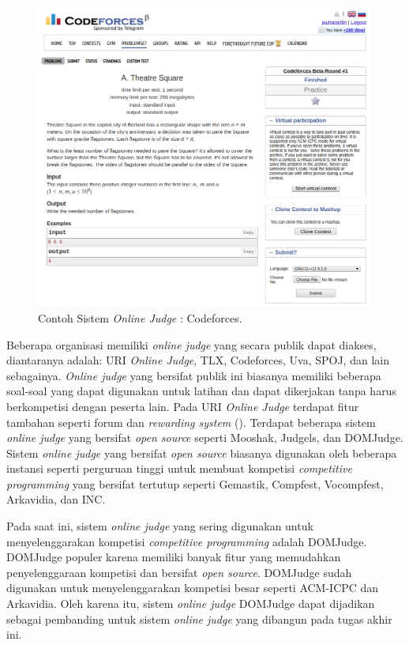 \begin{figure}[ht]
	\centering
	\includegraphics[width=\textwidth]{images/codeforces}
	\caption{Contoh Sistem \textit{Online Judge} : Codeforces.}
	\label{fig:codeforces}
\end{figure}

\par Beberapa organisasi memiliki \textit{online judge} yang secara publik dapat diakses, diantaranya adalah: URI \textit{Online Judge}, TLX, Codeforces, Uva, SPOJ, dan lain sebagainya. \textit{Online judge} yang bersifat publik ini biasanya memiliki beberapa soal-soal yang dapat digunakan untuk latihan dan dapat dikerjakan tanpa harus berkompetisi dengan peserta lain. Pada URI \textit{Online Judge} terdapat fitur tambahan seperti forum dan \textit{rewarding system} (\cite{uriojpaper}). Terdapat beberapa sistem \textit{online judge} yang bersifat \textit{open source} seperti Mooshak, Judgels, dan DOMJudge. Sistem \textit{online judge} yang bersifat \textit{open source} biasanya digunakan oleh beberapa instansi seperti perguruan tinggi untuk membuat kompetisi \textit{competitive programming} yang bersifat tertutup seperti Gemastik, Compfest, Vocompfest, Arkavidia, dan INC.

\par Pada saat ini, sistem \textit{online judge} yang sering digunakan untuk menyelenggarakan kompetisi \textit{competitive programming} adalah DOMJudge. DOMJudge populer karena memiliki banyak fitur yang memudahkan penyelenggaraan kompetisi dan bersifat \textit{open source}. DOMJudge sudah digunakan untuk menyelenggarakan kompetisi besar seperti ACM-ICPC dan Arkavidia. Oleh karena itu, sistem \textit{online judge} DOMJudge dapat dijadikan sebagai pembanding untuk sistem \textit{online judge} yang dibangun pada tugas akhir ini.

